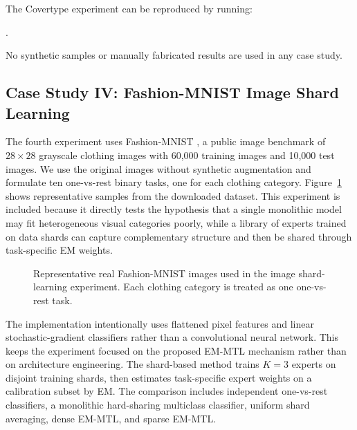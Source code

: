 \documentclass[preprint,12pt]{elsarticle}
\begin{document}
	The Covertype experiment can be reproduced by running:
	\begin{center}
	.
	\end{center}
	No synthetic samples or manually fabricated results are used in any case
	study.

	\subsection{Case Study IV: Fashion-MNIST Image Shard Learning}

	The fourth experiment uses Fashion-MNIST \citep{xiao2017fashion}, a
	public image benchmark of $28\times 28$ grayscale clothing images with
	60,000 training images and 10,000 test images. We use the original
	images without synthetic augmentation and formulate ten one-vs-rest
	binary tasks, one for each clothing category. Figure~\ref{fig:fashion_examples}
	shows representative samples from the downloaded dataset. This experiment
	is included because it directly tests the hypothesis that a single
	monolithic model may fit heterogeneous visual categories poorly, while
	a library of experts trained on data shards can capture complementary
	structure and then be shared through task-specific EM weights.

	\begin{figure}[t]
		\centering
		\caption{Representative real Fashion-MNIST images used in the image
			shard-learning experiment. Each clothing category is treated as one
			one-vs-rest task.}
		\label{fig:fashion_examples}
	\end{figure}

	The implementation intentionally uses flattened pixel features and
	linear stochastic-gradient classifiers rather than a convolutional neural
	network. This keeps the experiment focused on the proposed EM-MTL
	mechanism rather than on architecture engineering. The shard-based
	method trains $K=3$ experts on disjoint training shards, then estimates
	task-specific expert weights on a calibration subset by EM. The
	comparison includes independent one-vs-rest classifiers, a monolithic
	hard-sharing multiclass classifier, uniform shard averaging, dense
	EM-MTL, and sparse EM-MTL.
\end{document}
